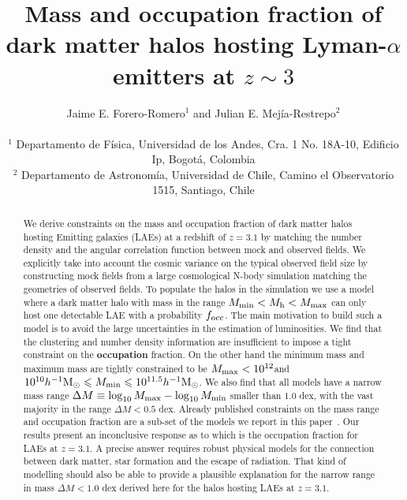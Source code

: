\documentclass[usenatbib]{mn2e}
\newcommand{\documentname}{paper~}
\newcommand{\ly}{{\ifmmode{{\rm Ly}\alpha}\else{Ly$\alpha$~}\fi}}
\newcommand{\hMsun}{{\ifmmode{h^{-1}{\rm
        {M_{\odot}}}}\else{$h^{-1}{\rm{M_{\odot}}}$}\fi}}
\begin{document}
\title[Halo mass and occupation fraction of LAEs at$z=3.1$]{Mass and
  occupation fraction of dark matter halos hosting Lyman-$\alpha$
  emitters at $z\sim 3$}      
\author[~J.~E. Forero-Romero and ~J.~E. Mejia-Restreo]{
\parbox[t]{\textwidth}{\raggedright 
  Jaime E. Forero-Romero$^{1}$ and
  Julian E. Mej\'ia-Restrepo$^{2}$ 
}
\vspace*{6pt}\\
$^{1}$ Departamento de F\'{i}sica, Universidad de los Andes, Cra. 1
No. 18A-10, Edificio Ip, Bogot\'a, Colombia \\
$^{2}$ Departamento de Astronom\'{i}a, Universidad de Chile, Camino el
Observatorio 1515, Santiago, Chile} 

\maketitle

\begin{abstract}
%
We derive constraints on the mass and occupation fraction of dark
matter halos hosting \ly Emitting galaxies (LAEs) at a redshift of
$z=3.1$ by matching the number density and the angular
correlation function between mock and observed fields. We explicitly
take into account the cosmic variance on the typical observed field
size by constructing mock fields from a large cosmological N-body
simulation matching the geometries of observed fields. To populate the
halos in the simulation we use a model where a dark matter halo with
mass in the range $M_{\rm min}<M_{\rm h}<M_{\rm max}$ can only host
one detectable LAE with a probability $f_{\rm occ}$. The main motivation to
build such a model is to avoid the large uncertainties in the estimation of
\ly luminosities. We find that the clustering and number density information are
insufficient to impose a tight constraint on the {\bf occupation} fraction. On
the other hand the minimum mass and maximum mass are tightly
constrained to be $M_{\rm max}<10^{12}$\hMsun and
$10^{10}\hMsun\leq M_{\rm min}\leq 10^{11.5}\hMsun$.  We also find
that all models have a narrow mass range $\Delta M \equiv
\log_{10}M_{\rm max} - \log_{10} M_{\rm min}$ smaller than $1.0$ dex,
with the vast majority in the range $\Delta M<0.5$ dex. Already
published constraints on the mass range and occupation fraction are a sub-set of
the models we report in this \documentname. Our results present an
inconclusive response as to which is the occupation fraction for LAEs
at $z=3.1$. A precise answer requires robust physical models for the
connection between dark matter, star formation and the escape of \ly
radiation. That kind of modelling should also be able to provide a
plausible explanation for the narrow range in mass $\Delta M<1.0$ dex
derived here for the halos hosting LAEs at $z=3.1$.   

\end{abstract}
\end{document}
